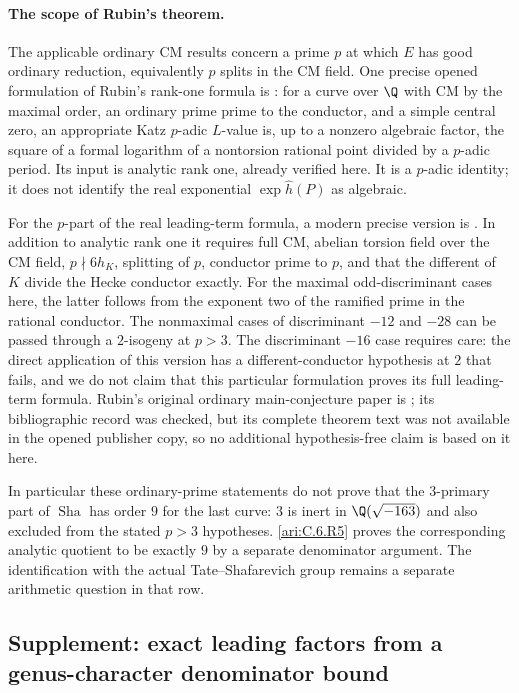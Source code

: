 \paragraph{The scope of Rubin's theorem.}
The applicable ordinary CM results concern a prime $p$ at which
$E$ has good ordinary reduction, equivalently $p$ splits in the CM
field. One precise opened formulation of Rubin's rank-one formula
is \citet[Theorem 1]{CrBDP2012}: for a curve over $\Q$ with CM
by the maximal order, an ordinary prime prime to the conductor,
and a simple central zero, an appropriate Katz $p$-adic $L$-value
is, up to a nonzero algebraic factor, the square of a formal
logarithm of a nontorsion rational point divided by a $p$-adic
period. Its input is analytic rank one, already verified here.
It is a $p$-adic identity; it does not identify the real exponential
$\exp\widehat h(P)$ as algebraic.

For the $p$-part of the real leading-term formula, a modern precise
version is \citet[Theorem A]{CrCastella2025}. In addition to analytic
rank one it requires full CM, abelian torsion field over the CM
field, $p\nmid6h_K$, splitting of $p$, conductor prime to $p$,
and that the different of $K$ divide the Hecke conductor exactly.
For the maximal odd-discriminant cases here, the latter follows
from the exponent two of the ramified prime in the rational
conductor. The nonmaximal cases of discriminant $-12$ and $-28$
can be passed through a $2$-isogeny at $p>3$. The discriminant
$-16$ case requires care: the direct application of this version
has a different-conductor hypothesis at $2$ that fails, and we
do not claim that this particular formulation proves its full
leading-term formula. Rubin's original ordinary main-conjecture
paper is \citep{CrRubin1991}; its bibliographic record was checked,
but its complete theorem text was not available in the opened
publisher copy, so no additional hypothesis-free claim is based
on it here.

In particular these ordinary-prime statements do not prove that
the $3$-primary part of $\operatorname{Sha}$ has order $9$ for the
last curve: $3$ is inert in $\Q(\sqrt{-163})$ and also excluded
from the stated $p>3$ hypotheses. \ref{ari:C.6.R5} proves the corresponding
analytic quotient to be exactly $9$ by a separate denominator
argument. The identification with the actual Tate--Shafarevich
group remains a separate arithmetic question in that row.


\subsection{Supplement: exact leading factors from a genus-character denominator bound}


